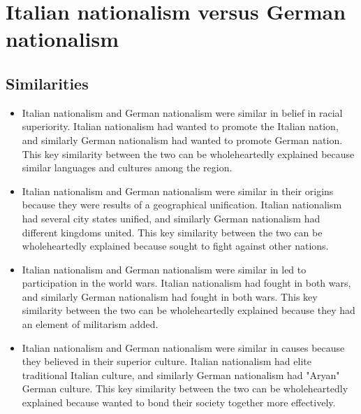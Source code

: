 \documentclass[letterpaper, 10pt]{article}
\begin{document}
        \section{Italian nationalism versus German nationalism}
            \subsection{Similarities}
                \begin{itemize}
                    \item Italian nationalism and German nationalism were similar in belief in racial superiority. Italian nationalism had wanted to promote the Italian nation, and similarly German nationalism had wanted to promote German nation. This key similarity between the two can be wholeheartedly explained because similar languages and cultures among the region.
                    \item Italian nationalism and German nationalism were similar in their origins because they were results of a geographical unification. Italian nationalism had several city states unified, and similarly German nationalism had different kingdoms united. This key similarity between the two can be wholeheartedly explained because sought to fight against other nations.
                    \item Italian nationalism and German nationalism were similar in led to participation in the world wars. Italian nationalism had fought in both wars, and similarly German nationalism had fought in both wars. This key similarity between the two can be wholeheartedly explained because they had an element of militarism added.
                    \item Italian nationalism and German nationalism were similar in causes because they believed in their superior culture. Italian nationalism had elite traditional Italian culture, and similarly German nationalism had "Aryan" German culture. This key similarity between the two can be wholeheartedly explained because wanted to bond their society together more effectively.
                \end{itemize}
\end{document}
